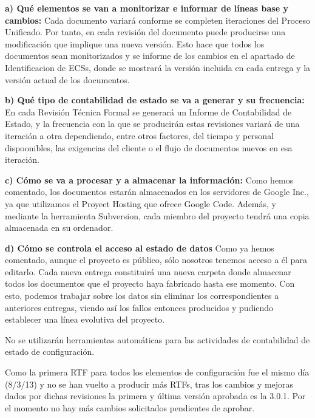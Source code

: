 \documentclass[spanish,a4paper,11pt, twoside]{report}	%
\begin{document}
	\textbf{a) Qué elementos se van a monitorizar e informar de líneas base y cambios:}
		Cada documento variará conforme se completen iteraciones del Proceso Unificado. Por tanto, en cada revisión del documento puede producirse una modificación que implique una nueva versión. Esto hace que todos los documentos sean monitorizados y se informe de los cambios en el apartado de Identificacion de ECSs, donde se mostrará la versión incluida en cada entrega y la versión actual de los documentos.
	

	\textbf{b) Qué tipo de contabilidad de estado se va a generar y su frecuencia:}
En cada Revisión Técnica Formal se generará un Informe de Contabilidad de Estado, y la frecuencia con la que se producirán estas revisiones variará de una iteración a otra dependiendo, entre otros factores, del tiempo y personal dispoonibles, las exigencias del cliente o el flujo de documentos nuevos en esa iteración.	

	\textbf{c) Cómo se va a procesar y a almacenar la información:}
Como hemos comentado, los documentos estarán almacenados en los servidores de Google Inc., ya que utilizamos el Proyect Hosting que ofrece Google Code. Además, y mediante la herramienta Subversion, cada miembro del proyecto tendrá una copia almacenada en su ordenador.
	

	\textbf{d) Cómo se controla el acceso al estado de datos}
Como ya hemos comentado, aunque el proyecto es público, sólo nosotros tenemos acceso a él para editarlo. Cada nueva entrega constituirá una nueva carpeta donde almacenar todos los documentos que el proyecto haya fabricado hasta ese momento. Con esto, podemos trabajar sobre los datos sin eliminar los correspondientes a anteriores entregas, viendo así los fallos entonces producidos y pudiendo establecer una línea evolutiva del proyecto.
	

	\vspace{0.3cm}
	No se utilizarán herramientas automáticas para las actividades de contabilidad de estado de configuración.

	Como la primera RTF para todos los elementos de configuración fue el mismo día (8/3/13) y no se han vuelto a producir más RTFs, tras los cambios y mejoras dados por dichas revisiones la primera y última versión aprobada es la 3.0.1. Por el momento no hay más cambios solicitados pendientes de aprobar.


\setcounter{section}{0}

\end{document}
